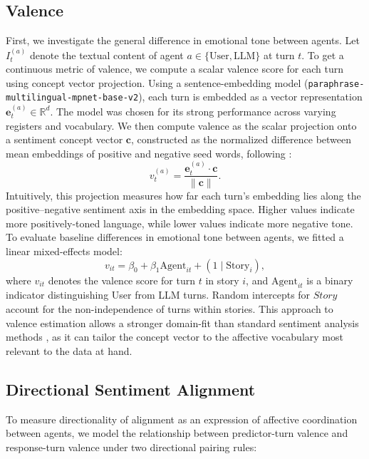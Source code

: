 \documentclass[11pt]{article}
\begin{document}
\subsection{Valence}
First, we investigate the general difference in emotional tone between agents. Let $I_{t}^{(a)}$ denote the textual content of agent $a \in \{\mathrm{User}, \mathrm{LLM}\}$ at turn $t$. To get a continuous metric of valence, we compute a scalar valence score for each turn using concept vector projection. Using a sentence-embedding model (\texttt{paraphrase-multilingual-mpnet-base-v2}), each turn is embedded as a vector representation $\mathbf{e}_{t}^{(a)} \in \mathbb{R}^d$. The model was chosen for its strong performance across varying registers and vocabulary.
We then compute valence as the scalar projection onto a sentiment concept vector $\mathbf{c}$, constructed as the normalized difference between mean embeddings of positive and negative seed words, following \citet{lyngbaek2025continuous}:
\begin{equation}
v_{t}^{(a)} = \frac{\mathbf{e}_{t}^{(a)} \cdot \mathbf{c}}{\|\mathbf{c}\|}.
\end{equation}
Intuitively, this projection measures how far each turn's embedding lies along the positive--negative sentiment axis in the embedding space. Higher values indicate more positively-toned language, while lower values indicate more negative tone.
To evaluate baseline differences in emotional tone between agents, we fitted a linear mixed-effects model:
\begin{equation}
v_{it} = \beta_0 + \beta_1 \mathrm{Agent}_{it} + (1 \mid \mathrm{Story}_i),
\end{equation}
where $v_{it}$ denotes the valence score for turn $t$ in story $i$, and $\mathrm{Agent}_{it}$ is a binary indicator distinguishing User from LLM turns. Random intercepts for $Story$ account for the non-independence of turns within stories. This approach to valence estimation allows a stronger domain-fit than standard sentiment analysis methods \cite{lyngbaek2025continuous}, as it can tailor the concept vector to the affective vocabulary most relevant to the data at hand.

\subsection{Directional Sentiment Alignment}
To measure directionality of alignment as an expression of affective coordination between agents, we model the relationship between predictor-turn valence and response-turn valence under two directional pairing rules: 
\end{document}
